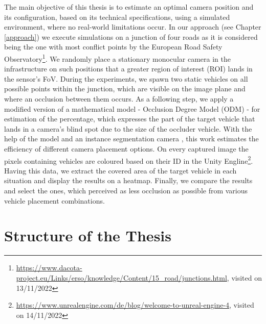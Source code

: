 The main objective of this thesis is to estimate an optimal camera position and its configuration, based on its technical specifications, using a simulated environment, where no real-world limitations occur. In our approach (see Chapter \ref{approach}) we execute simulations on a junction of four roads as it is considered being the one with most conflict points by the European Road Safety Observatory\footnote{\url{https://www.dacota-project.eu/Links/erso/knowledge/Content/15_road/junctions.html}, visited on 13/11/2022}. We randomly place a stationary monocular camera in the infrastructure on such positions that a greater region of interest (ROI) lands in the sensor's FoV. During the experiments, we spawn two static vehicles on all possible points within the junction, which are visible on the image plane and where an occlusion between them occurs. As a following step, we apply a modified version of a mathematical model - Occlusion Degree Model (ODM) \cite{occlusion_degree_model} - for estimation of the percentage, which expresses the part of the target vehicle that lands in a camera's blind spot due to the size of the occluder vehicle. With the help of the model and an instance segmentation camera \cite{instance_segmenatation_cam}, this work estimates the efficiency of different camera placement options. On every captured image the pixels containing vehicles are coloured based on their ID in the Unity Engline\footnote{\url{https://www.unrealengine.com/de/blog/welcome-to-unreal-engine-4}, visited on 14/11/2022}. Having this data, we extract the covered area of the target vehicle in each situation and display the results on a heatmap. Finally, we compare the results and select the ones, which perceived as less occlusion as possible from various vehicle placement combinations. 
\newpage

\section{Structure of the Thesis}


